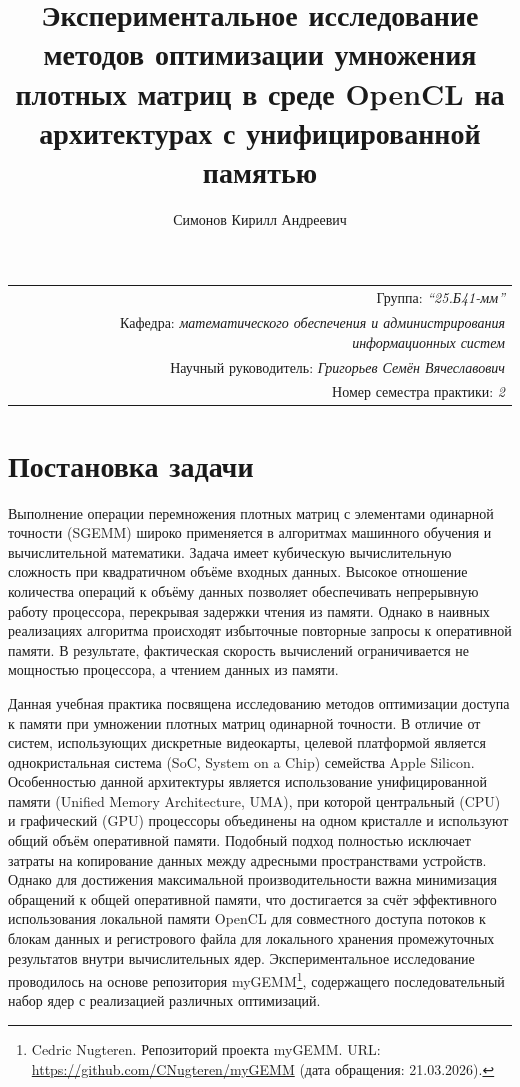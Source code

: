 \documentclass[a4paper]{article}
\title{Экспериментальное исследование методов оптимизации умножения плотных матриц в среде OpenCL на архитектурах с унифицированной памятью}
\author{Симонов Кирилл Андреевич}
\date{}
\begin{document}
\maketitle

\begin{flushright}
\begin{tabular}{r}
    Группа: \emph{\enquote{25.Б41-мм}} \\
    Кафедра: \emph{математического обеспечения и администрирования информационных систем} \\
    Научный руководитель: \emph{Григорьев Семён Вячеславович} \\
    Номер семестра практики: \emph{2} \\
\end{tabular}
\end{flushright}

\section{Постановка задачи}

Выполнение операции перемножения плотных матриц с элементами одинарной точности (SGEMM) широко применяется в алгоритмах машинного обучения и вычислительной математики. Задача имеет кубическую вычислительную сложность при квадратичном объёме входных данных. Высокое отношение количества операций к объёму данных позволяет обеспечивать непрерывную работу процессора, перекрывая задержки чтения из памяти. Однако в наивных реализациях алгоритма происходят избыточные повторные запросы к оперативной памяти. В результате, фактическая скорость вычислений ограничивается не мощностью процессора, а чтением данных из памяти.

Данная учебная практика посвящена исследованию методов оптимизации доступа к памяти при умножении плотных матриц одинарной точности. В отличие от систем, использующих дискретные видеокарты, целевой платформой является однокристальная система (SoC, System on a Chip) семейства Apple Silicon. Особенностью данной архитектуры является использование унифицированной памяти (Unified Memory Architecture, UMA), при которой центральный (CPU) и графический (GPU) процессоры объединены на одном кристалле и используют общий объём оперативной памяти. Подобный подход полностью исключает затраты на копирование данных между адресными пространствами устройств. Однако для достижения максимальной производительности важна минимизация обращений к общей оперативной памяти, что достигается за счёт эффективного использования локальной памяти OpenCL для совместного доступа потоков к блокам данных и регистрового файла для локального хранения промежуточных результатов внутри вычислительных ядер. Экспериментальное исследование проводилось на основе репозитория myGEMM\footnote{Cedric Nugteren. Репозиторий проекта myGEMM. URL: \url{https://github.com/CNugteren/myGEMM} (дата обращения: 21.03.2026).}, содержащего последовательный набор ядер с реализацией различных оптимизаций.
\end{document}
